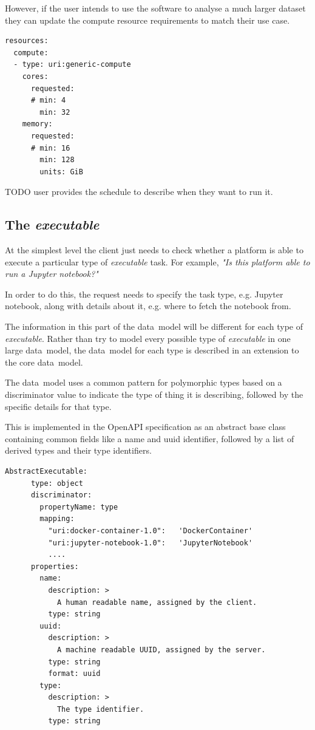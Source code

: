 \documentclass[11pt,a4paper]{ivoa}
\newcommand{\openapi} {OpenAPI}
\newcommand{\datamodel} {data~model}
\newcommand{\executable} {\textit{executable}}
\newcommand{\excutabletask} {\textit{executable} task}
\newcommand{\jupyternotebook} {Jupyter notebook}
\newcommand{\dataset}[1] {dataset#1}
\begin{document}
However, if the user intends to use the software to analyse a much larger \dataset{}
they can update the compute resource requirements to match their use case.

\begin{lstlisting}[]
resources:
  compute:
  - type: uri:generic-compute
    cores:
      requested:
      # min: 4
        min: 32
    memory:
      requested:
      # min: 16
        min: 128
        units: GiB
\end{lstlisting}

TODO user provides the schedule to describe when they want to run it.

\subsection{The \executable{}}
\label{executable}

At the simplest level the client just needs to check whether a platform is able to execute a particular
type of \excutabletask{}.
For example, \textit{"Is this platform able to run a \jupyternotebook{}?"}

In order to do this, the request needs to specify the task type, e.g. \jupyternotebook{},
along with details about it, e.g. where to fetch the notebook from.

The information in this part of the \datamodel{} will be different for each type of \executable{}.
Rather than try to model every possible type of \executable{} in one large \datamodel{},
the \datamodel{} for each type is described in an extension to the core \datamodel{}.

The \datamodel{} uses a common pattern for polymorphic types based on a discriminator
value to indicate the type of thing it is describing, followed by the specific
details for that type.

This is implemented in the \openapi{} specification as an abstract base class
containing common fields like a name and uuid identifier, followed by a list
of derived types and their type identifiers.

\begin{lstlisting}[]
    AbstractExecutable:
      type: object
      discriminator:
        propertyName: type
        mapping:
          "uri:docker-container-1.0":   'DockerContainer'
          "uri:jupyter-notebook-1.0":   'JupyterNotebook'
          ....
      properties:
        name:
          description: >
            A human readable name, assigned by the client.
          type: string
        uuid:
          description: >
            A machine readable UUID, assigned by the server.
          type: string
          format: uuid
        type:
          description: >
            The type identifier.
          type: string
\end{lstlisting}
\end{document}

